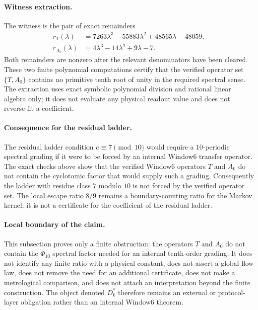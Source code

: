 \paragraph{Witness extraction.}
The witness is the pair of exact remainders
$$
\begin{aligned}
r_T(\lambda)&=7263\lambda^3-55883\lambda^2+48565\lambda-48059,\\
r_{A_0}(\lambda)&=4\lambda^3-14\lambda^2+9\lambda-7.
\end{aligned}
$$
Both remainders are nonzero after the relevant denominators have been cleared.  These two finite polynomial computations certify that the verified operator set $\{T,A_0\}$ contains no primitive tenth root of unity in the required spectral sense.  The extraction uses exact symbolic polynomial division and rational linear algebra only; it does not evaluate any physical readout value and does not reverse-fit a coefficient.

\paragraph{Consequence for the residual ladder.}
The residual ladder condition $e\equiv 7\pmod {10}$ would require a $10$-periodic spectral grading if it were to be forced by an internal Window6 transfer operator.  The exact checks above show that the verified Window6 operators $T$ and $A_0$ do not contain the cyclotomic factor that would supply such a grading.  Consequently the ladder with residue class $7$ modulo $10$ is not forced by the verified operator set.  The local escape ratio $8/9$ remains a boundary-counting ratio for the Markov kernel; it is not a certificate for the coefficient of the residual ladder.

\paragraph{Local boundary of the claim.}
This subsection proves only a finite obstruction: the operators $T$ and $A_0$ do not contain the $\Phi_{10}$ spectral factor needed for an internal tenth-order grading.  It does not identify any finite ratio with a physical constant, does not assert a global flow law, does not remove the need for an additional certificate, does not make a metrological comparison, and does not attach an interpretation beyond the finite construction.  The object denoted $D^*_6$ therefore remains an external or protocol-layer obligation rather than an internal Window6 theorem.
